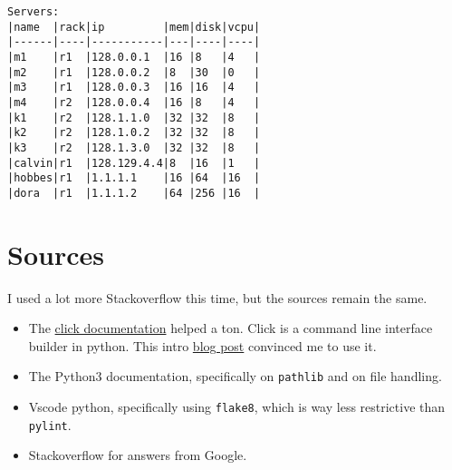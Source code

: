 \documentclass[11pt]{article}
\begin{document}
\begin{verbatim}
Servers:
|name  |rack|ip         |mem|disk|vcpu|
|------|----|-----------|---|----|----|
|m1    |r1  |128.0.0.1  |16 |8   |4   |
|m2    |r1  |128.0.0.2  |8  |30  |0   |
|m3    |r1  |128.0.0.3  |16 |16  |4   |
|m4    |r2  |128.0.0.4  |16 |8   |4   |
|k1    |r2  |128.1.1.0  |32 |32  |8   |
|k2    |r2  |128.1.0.2  |32 |32  |8   |
|k3    |r2  |128.1.3.0  |32 |32  |8   |
|calvin|r1  |128.129.4.4|8  |16  |1   |
|hobbes|r1  |1.1.1.1    |16 |64  |16  |
|dora  |r1  |1.1.1.2    |64 |256 |16  |
\end{verbatim}

\section{Sources}
\label{sec:org243a4ea}
I used a lot more Stackoverflow this time, but the sources remain the same.

\begin{itemize}
\item The \href{http://click.pocoo.org/5/}{click documentation} helped a ton.  Click is a command line interface builder in python.  This intro \href{https://kushaldas.in/posts/building-command-line-tools-in-python-with-click.html}{blog post} convinced me to use it.
\item The Python3 documentation, specifically on \texttt{pathlib} and on file handling.
\item Vscode python, specifically using \texttt{flake8}, which is way less restrictive than \texttt{pylint}.
\item Stackoverflow for answers from Google.
\end{itemize}
\end{document}
